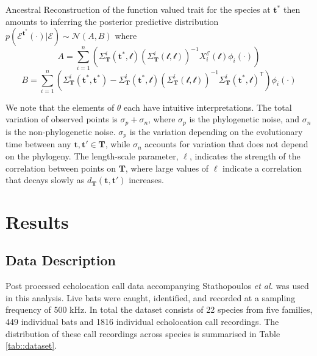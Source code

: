 \documentclass{ws-rv9x6}
\begin{document}
Ancestral Reconstruction of the function valued trait for the species at \(\mathbf{t}^*\) then amounts to inferring the posterior predictive distribution \(p(\mathcal{E}^{\mathbf{t}^*} (\cdot) | \mathcal{E}) \sim \mathcal{N}(A, B)\) where 
\begin{equation}
A = \sum_{i=1}^{n} \left( \Sigma_{\mathbf{T}}^i(\mathbf{t}^*, \mathcal{t}) \left( \Sigma_{\mathbf{T}}^i(\mathcal{t}, \mathcal{t})
\right)^{-1} X_i^{\mathcal{E}} (\mathcal{t}) \phi_i(\cdot) \right)
\label{eqn:postmean}
\end{equation}
\begin{equation}
B = \sum_{i=1}^{n}\left( \Sigma_{\mathbf{T}}^i(\mathbf{t}^*, \mathbf{t}^*) -  \Sigma_{\mathbf{T}}^i(\mathbf{t}^*, \mathcal{t}) \left( \Sigma_{\mathbf{T}}^i(\mathcal{t}, \mathcal{t})
\right)^{-1} \Sigma_{\mathbf{T}}^i(\mathbf{t}^*, \mathcal{t})^{\mathsf{T}} \right) \phi_i (\cdot)
\label{eqn:postvar}
\end{equation}

We note that the elements of \(\theta\) each have intuitive interpretations. The total variation of observed points is \(\sigma_p + \sigma_n\), where \(\sigma_p\) is the phylogenetic noise, and \(\sigma_n\) is the non-phylogenetic noise. \(\sigma_p\) is the variation depending on the evolutionary time between any \(\mathbf{t}, \mathbf{t}' \in \mathbf{T}\), while \(\sigma_n\) accounts for variation that does not depend on the phylogeny. The length-scale parameter, \(\ell\), indicates the strength of the correlation between points on \(\mathbf{T}\), where large values of \(\ell\) indicate a correlation that decays slowly as \(d_{\mathbf{T}}(\mathbf{t}, \mathbf{t}')\) increases. 

\section{Results}
\label{sec:results}
\subsection{Data Description}

Post processed echolocation call data accompanying Stathopoulos \textit{et al.} \cite{stathopoulos2017bat} was used in this analysis. Live bats were caught, identified, and recorded at a sampling frequency of 500 kHz. 
In total the dataset consists of 22 species from five families, 449 individual bats and 1816 individual echolocation call recordings. The distribution of these call recordings across species is summarised in Table \ref{tab::dataset}.
\end{document}
